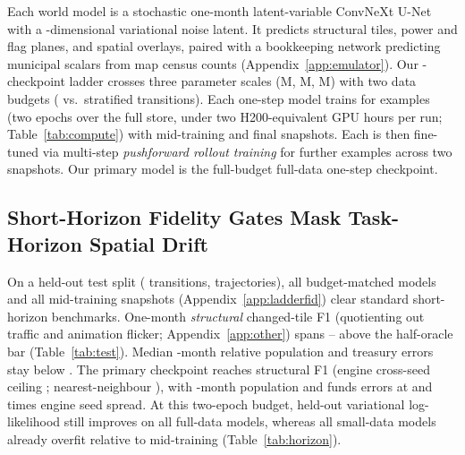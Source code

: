 Each world model is a stochastic one-month latent-variable ConvNeXt U-Net \citep{ronneberger2015unet,liu2022convnext} with a \ZDim-dimensional variational noise latent. It predicts structural tiles, power and flag planes, and spatial overlays, paired with a bookkeeping network predicting municipal scalars from map census counts (Appendix~\ref{app:emulator}). Our \Ladder-checkpoint ladder crosses three parameter scales (\ParamsFifteen{}M, \ParamsFifty{}M, \ParamsHundred{}M) with two data budgets (\TrainTransitions{} vs.\ stratified \SmallTransitions{} transitions). Each one-step model trains for \HpSamplesOs{} examples (two epochs over the full store, under two H200-equivalent GPU hours per run; Table~\ref{tab:compute}) with mid-training and final snapshots. Each is then fine-tuned via multi-step \emph{pushforward rollout training} \PushforwardCites{} for \HpSamplesSf{} further examples across two snapshots. Our primary model is the full-budget \SizeM{} full-data one-step checkpoint.

\subsection{Short-Horizon Fidelity Gates Mask Task-Horizon Spatial Drift}\label{sec:fidelity}

On a held-out test split (\TestTransitions{} transitions, \TestPlans{} trajectories), all \TestRuns{} budget-matched models\ifTestHalfAllPass{} and all \TestHalfN{} mid-training snapshots (Appendix~\ref{app:ladderfid})\fi{} clear standard short-horizon benchmarks. One-month \emph{structural} changed-tile F1 (quotienting out traffic and animation flicker; Appendix~\ref{app:other}) spans \TestFOneMin{}--\TestFOneMax{} above the \TestBarFOne{} half-oracle bar (Table~\ref{tab:test}). Median \RollA-month relative population and treasury errors stay below \KillPop{}. The primary \SizeM{} checkpoint reaches \TestMainFOne{} \ci{\TestMainFOneCI} structural F1 (engine cross-seed ceiling \TestFloorFOne{}; nearest-neighbour \TestNNFOne{}), with \RollA-month population and funds errors at \TestPopRatio{} and \TestFundsRatio{} times engine seed spread. At this two-epoch budget, held-out variational log-likelihood still improves on all full-data models, whereas all \HlSmallN{} small-data models already overfit relative to mid-training (Table~\ref{tab:horizon}).

